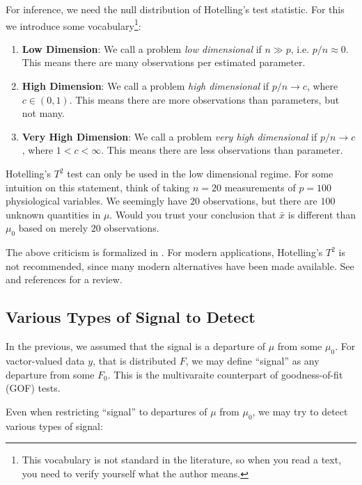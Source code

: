 \documentclass[]{book}
\providecommand{\tightlist}{%
  \setlength{\itemsep}{0pt}\setlength{\parskip}{0pt}}
\theoremstyle{definition}
\theoremstyle{definition}
\theoremstyle{definition}
\theoremstyle{remark}
\begin{document}
For inference, we need the null distribution of Hotelling's test statistic. For this we introduce some vocabulary\footnote{This vocabulary is not standard in the literature, so when you read a text, you need to verify yourself what the author means.}:

\begin{enumerate}
\def\labelenumi{\arabic{enumi}.}
\tightlist
\item
  \textbf{Low Dimension}:
  We call a problem \emph{low dimensional} if \(n \gg p\), i.e. \(p/n \approx 0\).
  This means there are many observations per estimated parameter.
\item
  \textbf{High Dimension}:
  We call a problem \emph{high dimensional} if \(p/n \to c\), where \(c\in (0,1)\).
  This means there are more observations than parameters, but not many.
\item
  \textbf{Very High Dimension}:
  We call a problem \emph{very high dimensional} if \(p/n \to c\), where \(1<c<\infty\).
  This means there are less observations than parameter.
\end{enumerate}

Hotelling's \(T^2\) test can only be used in the low dimensional regime.
For some intuition on this statement, think of taking \(n=20\) measurements of \(p=100\) physiological variables.
We seemingly have \(20\) observations, but there are \(100\) unknown quantities in \(\mu\).
Would you trust your conclusion that \(\bar x\) is different than \(\mu_0\) based on merely \(20\) observations.

The above criticism is formalized in \citet{bai1996effect}.
For modern applications, Hotelling's \(T^2\) is not recommended, since many modern alternatives have been made available. See \citet{rosenblatt2016better} and references for a review.

\hypertarget{various-types-of-signal-to-detect}{%
\subsection{Various Types of Signal to Detect}\label{various-types-of-signal-to-detect}}

In the previous, we assumed that the signal is a departure of \(\mu\) from some \(\mu_0\).
For vactor-valued data \(y\), that is distributed \(F\), we may define ``signal'' as any departure from some \(F_0\).
This is the multivaraite counterpart of goodness-of-fit (GOF) tests.

Even when restricting ``signal'' to departures of \(\mu\) from \(\mu_0\), we may try to detect various types of signal:
\end{document}
